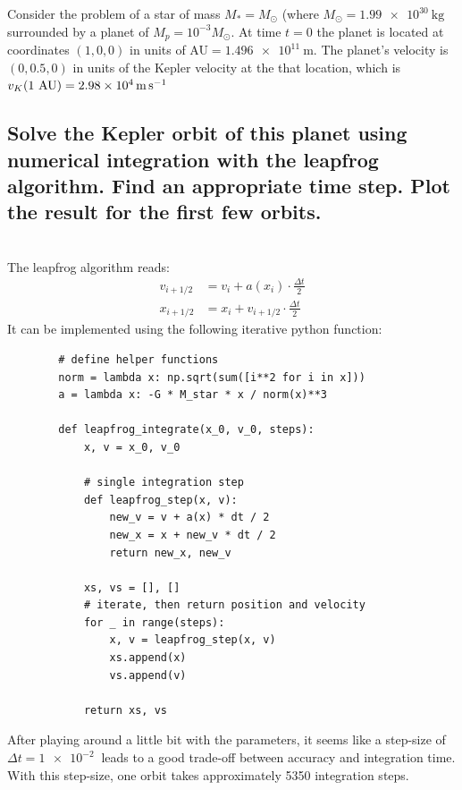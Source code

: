 Consider the problem of a star of mass $M_*=M_\odot$ (where 
$M_\odot=\SI{1.99e30}{\kilogram}$ surrounded by a planet of 
$M_p=10^{-3} M_\odot$. At time $t=0$ the planet is located at 
coordinates $(1,0,0)$ in units of AU$=\SI{1.496e11}{\meter}$. The 
planet's velocity is $(0,0.5,0)$ in units of the Kepler velocity at the 
that location, which is 
$v_K(1\textnormal{ AU})=\SI{2.98e4}{\meter\per\second}$
\\

\subsection{Solve the Kepler orbit of this planet using numerical
    integration with the leapfrog algorithm. Find an appropriate 
    time step. Plot the result for the first few orbits.
} \ \\
    The leapfrog algorithm reads:
    \begin{align}
        v_{i+1/2}&=v_i+a(x_i)\cdot\frac{\Delta t}{2} \\
        x_{i+1/2}&=x_{i}+v_{i+1/2}\cdot\frac{\Delta t}{2}
    \end{align}
    It can be implemented using the following iterative python function: \\
    \begin{lstlisting}
        # define helper functions
        norm = lambda x: np.sqrt(sum([i**2 for i in x]))
        a = lambda x: -G * M_star * x / norm(x)**3

        def leapfrog_integrate(x_0, v_0, steps):
            x, v = x_0, v_0
        
            # single integration step
            def leapfrog_step(x, v): 
                new_v = v + a(x) * dt / 2
                new_x = x + new_v * dt / 2
                return new_x, new_v
        
            xs, vs = [], []
            # iterate, then return position and velocity
            for _ in range(steps):
                x, v = leapfrog_step(x, v)
                xs.append(x)
                vs.append(v)

            return xs, vs\end{lstlisting} 
    After playing around a little bit with the parameters, it seems like 
    a step-size of $\Delta t=\SI{1e-2}{}$ leads to a good trade-off between 
    accuracy and integration time. With this step-size, one orbit takes 
    approximately 5350 integration steps.

